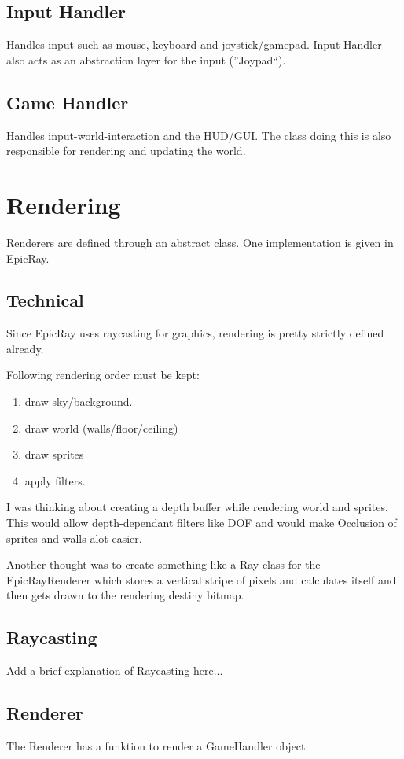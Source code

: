 \documentclass[11pt,a4paper,notitlepage]{article}
\begin{document}
\subsection{Input Handler}
Handles input such as mouse, keyboard and joystick/gamepad. Input Handler also acts as an abstraction layer for the input (''Joypad``).

\subsection{Game Handler}
Handles input-world-interaction and the HUD/GUI. The class doing this is also responsible for rendering and updating the world.

\section{Rendering}
Renderers are defined through an abstract class. One implementation is given in EpicRay.

\subsection{Technical}
Since EpicRay uses raycasting for graphics, rendering is pretty strictly defined already. 

Following rendering order must be kept:
\begin{enumerate}
\item draw sky/background. 
\item draw world (walls/floor/ceiling)
\item draw sprites
\item apply filters.
\end{enumerate}

I was thinking about creating a depth buffer while rendering world and sprites. This would allow depth-dependant filters like DOF and would make Occlusion of sprites and walls alot easier.

Another thought was to create something like a Ray class for the EpicRayRenderer which stores a vertical stripe of pixels and calculates itself and then gets drawn to the rendering destiny bitmap.

\subsection{Raycasting}
Add a brief explanation of Raycasting here...

\subsection{Renderer}
The Renderer has a funktion to render a GameHandler object. 

 
\end{document}
